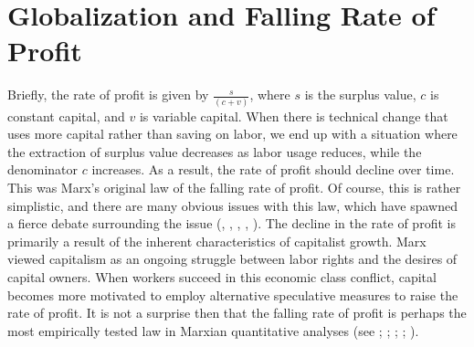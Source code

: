 \documentclass[10pt]{article}
\begin{document}
\section{Globalization and Falling Rate of Profit}
Briefly, the rate of profit is given by $\frac{s}{(c+v)}$, where $s$ is the surplus value, $c$ is constant capital, and $v$ is variable capital. When there is technical change that uses more capital rather than saving on labor, we end up with a situation where the extraction of surplus value decreases as labor usage reduces, while the denominator $c$ increases. As a result, the rate of profit should decline over time. This was Marx's original law of the falling rate of profit. Of course, this is rather simplistic, and there are many obvious issues with this law, which have spawned a fierce debate surrounding the issue (\citet{dobb1939political}, \citet{sweezy1942theory}, \citet{okishio1961technical}, \citet{mage1963law}, \citet{foley1986understanding}). The decline in the rate of profit is primarily a result of the inherent characteristics of capitalist growth. Marx viewed capitalism as an ongoing struggle between labor rights and the desires of capital owners. When workers succeed in this economic class conflict, capital becomes more motivated to employ alternative speculative measures to raise the rate of profit. It is not a surprise then that the falling rate of profit is perhaps the most empirically tested law in Marxian quantitative analyses (see \citet{FeldsteinSummersWachter1977}; \citet{Wolff1979}; \citet{Moseley1991}; \citet{Shaikh1992}; \citet{BasuManolakos2013}). 
\end{document}
